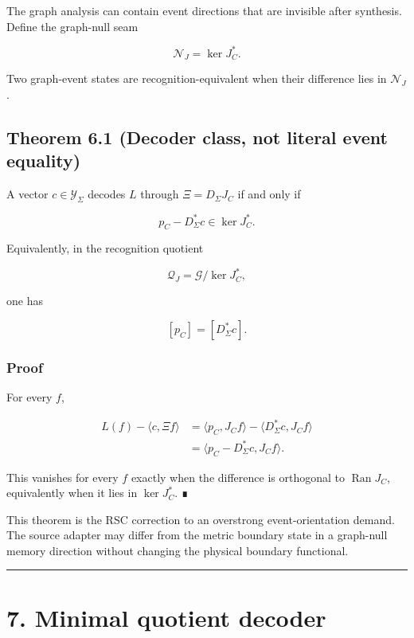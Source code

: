 The graph analysis can contain event directions that are invisible after
synthesis. Define the graph-null seam

\[
\boxed{
\mathcal N_J=\ker J_C^*.
}
\]

Two graph-event states are recognition-equivalent when their difference lies in
\(\mathcal N_J\).

\hypertarget{theorem-6.1-decoder-class-not-literal-event-equality}{%
\subsection{Theorem 6.1 (Decoder class, not literal event equality)}\label{theorem-6.1-decoder-class-not-literal-event-equality}}

A vector \(c\in\mathcal Y_\Sigma\) decodes \(L\) through \(\Xi=D_\Sigma J_C\)
if and only if

\[
\boxed{
p_C-D_\Sigma^*c\in\ker J_C^*.}
\tag{6.1}
\]

Equivalently, in the recognition quotient

\[
\mathcal Q_J
=
\mathcal G/\ker J_C^*,
\]

one has

\[
\boxed{
[p_C]=[D_\Sigma^*c].
}
\tag{6.2}
\]

\hypertarget{proof-2}{%
\subsubsection{Proof}\label{proof-2}}

For every \(f\),

\[
\begin{aligned}
L(f)-\langle c,\Xi f\rangle
&=
\langle p_C,J_Cf\rangle
-
\langle D_\Sigma^*c,J_Cf\rangle\\
&=
\langle p_C-D_\Sigma^*c,J_Cf\rangle.
\end{aligned}
\]

This vanishes for every \(f\) exactly when the difference is orthogonal to
\(\operatorname{Ran}J_C\), equivalently when it lies in \(\ker J_C^*\). ∎

This theorem is the RSC correction to an overstrong event-orientation demand.
The source adapter may differ from the metric boundary state in a graph-null
memory direction without changing the physical boundary functional.

\begin{center}\rule{0.5\linewidth}{0.5pt}\end{center}

\hypertarget{minimal-quotient-decoder}{%
\section{7. Minimal quotient decoder}\label{minimal-quotient-decoder}}

